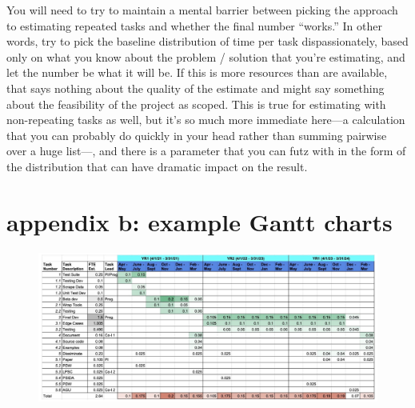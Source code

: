 \documentclass[12pt,oneside]{book}
\begin{document}
You will need to try to maintain a mental barrier between picking the approach to estimating repeated tasks and whether the final number ``works.'' In other words, try to pick the baseline distribution of time per task dispassionately, based only on what you know about the problem / solution that you're estimating, and let the number be what it will be. If this is more resources than are available, that says nothing about the quality of the estimate and might say something about the feasibility of the project as scoped. This is true for estimating with non-repeating tasks as well, but it's so much more immediate here---a calculation that you can probably do quickly in your head rather than summing pairwise over a huge list---, and there is a parameter that you can futz with in the form of the distribution that can have dramatic impact on the result.

\chapter*{appendix b: example Gantt charts}

\begin{figure}[h]
\centering
\includegraphics[width=\textwidth]{Gantt_02.png}
\centering
\end{figure}
\end{document}
